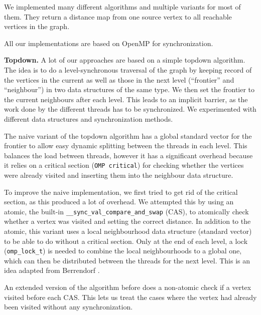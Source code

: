 \documentclass[letterpaper]{article}
\newcommand{\mypar}[1]{{\bf #1.}} %
\begin{document}
		We implemented many different algorithms and multiple variants for most of them. They return a distance map from one source vertex to all reachable vertices in the graph.
		
		All our implementations are based on OpenMP for synchronization.
		
		
		\mypar{Topdown}
		A lot of our approaches are based on a simple topdown algorithm. 
		The idea is to do a level-synchronous traversal of the graph by keeping record of the vertices in the current as well as those in the next level (``frontier'' and ``neighbour'') in two data structures of the same type. 
		We then set the frontier to the current neighbours after each level. 
		This leads to an implicit barrier, as the work done by the different threads has to be synchronized. 
		We experimented with different data structures and synchronization methods.
		
		The naive variant of the topdown algorithm has a global standard vector for the frontier to allow easy dynamic splitting between the threads in each level. 
		This balances the load between threads, however it has a significant overhead because it relies on a critical section (\verb+OMP critical+) for checking whether the vertices were already visited and inserting them into the neighbour data structure.
		
		To improve the naive implementation, we first tried to get rid of the critical section, as this produced a lot of overhead. 
		We attempted this by using an atomic, the built-in \verb+__sync_val_compare_and_swap+ (CAS), to atomically check whether a vertex was visited and setting the correct distance. 
		In addition to the atomic, this variant uses a local neighbourhood data structure (standard vector) to be able to do without a critical section. 
		Only at the end of each level, a lock (\verb+omp_lock_t+) is needed to combine the local neighbourhoods to a global one, which can then be distributed between the threads for the next level. 
		This is an idea adapted from Berrendorf \cite{Berrendorf:14}.
		
		An extended version of the algorithm before does a non-atomic check if a vertex visited before each CAS. 
		This lets us treat the cases where the vertex had already been visited without any synchronization.
		
\end{document}
